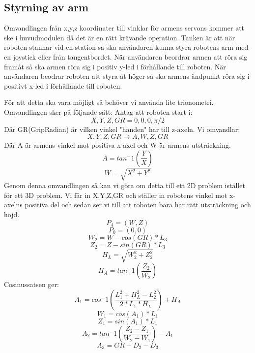 \subsection{Styrning av arm}
 Omvandlingen från x,y,z koordinater till vinklar för armens servons kommer att ske i huvudmodulen då det är en rätt krävande operation. Tanken är att när roboten stannar vid en station så ska användaren kunna styra robotens arm med en joystick eller från tangentbordet. När användaren beordrar armen att röra sig framåt så ska armen röra sig i positiv y-led i förhållande till roboten. När användaren beodrar roboten att styra åt höger så ska armens ändpunkt röra sig i positivt x-led i förhållande till roboten.
 \newline
 \begin{figure}[h]
 \centerline{}
 \caption{}
 \end{figure}
 \begin{figure}[h]
\centerline{}
\caption{}
\end{figure}
\newline
 För att detta ska vara möjligt så behöver vi använda lite trionometri. Omvandlingen sker på följande sätt:
Antag att roboten start i: $$X,Y,Z,GR=0,0,0,\pi/2$$
Där GR(GripRadian) är vilken vinkel "handen" har till z-axeln.\newline
Vi omvandlar:$$ X,Y,Z,GR\rightarrow A,W,Z,GR$$ 
Där A är armens vinkel mot positiva x-axel och W är armens utsträckning.
$$A=tan^-1(\dfrac{Y}{X}) $$
$$W=\sqrt{X^2+Y^2}$$
Genom denna omvandlingen så kan vi göra om detta till ett 2D problem istället för ett 3D problem. Vi får in X,Y,Z,GR och ställer in robotens vinkel mot x-axelns positiva del och sedan ser vi till att roboten bara har rätt utsträckning och höjd.
$$P_4=(W,Z)$$
$$P_0=(0,0)$$
$$W_2=W-cos(GR)*L_3$$
$$Z_2=Z-sin(GR)*L_3$$
$$H_L=\sqrt{W_2^2+Z_2^2}$$
$$H_A=tan^-1(\dfrac{Z_2}{W_2})$$
Cosinussatsen ger:
$$A_1=cos^-1(\dfrac{L_1^2+H_L^2-L_2^2}{2*L_1*H_L})+H_A$$
$$W_1=cos(A_1)*L_1$$
$$Z_1=sin(A_1)*L_1$$
$$A_2=tan^-1(\dfrac{Z_2-Z_1}{W_2-W_1})-A_1$$
$$A_3=GR-D_2-D_3$$

